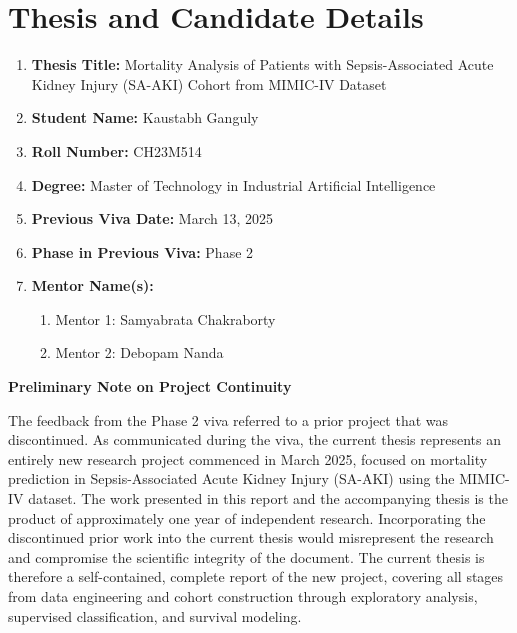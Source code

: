 \documentclass[12pt,a4paper]{article}
\begin{document}
\section*{}

\vspace{\baselineskip}

\section*{Thesis and Candidate Details}

\vspace{\baselineskip}

\begin{enumerate}
    \item \textbf{Thesis Title:} Mortality Analysis of Patients with Sepsis-Associated Acute Kidney Injury (SA-AKI) Cohort from MIMIC-IV Dataset
    \item \textbf{Student Name:} Kaustabh Ganguly
    \item \textbf{Roll Number:} CH23M514
    \item \textbf{Degree:} Master of Technology in Industrial Artificial Intelligence
    \item \textbf{Previous Viva Date:} March 13, 2025
    \item \textbf{Phase in Previous Viva:} Phase 2
    \item \textbf{Mentor Name(s):}
        \begin{enumerate}[label=(\roman*)]
            \item Mentor 1: Samyabrata Chakraborty
            \item Mentor 2: Debopam Nanda
        \end{enumerate}
\end{enumerate}

\vspace{\baselineskip}

\noindent\textbf{Preliminary Note on Project Continuity}

\vspace{0.5\baselineskip}

\noindent The feedback from the Phase 2 viva referred to a prior project that was discontinued. As communicated during the viva, the current thesis represents an entirely new research project commenced in March 2025, focused on mortality prediction in Sepsis-Associated Acute Kidney Injury (SA-AKI) using the MIMIC-IV dataset. The work presented in this report and the accompanying thesis is the product of approximately one year of independent research. Incorporating the discontinued prior work into the current thesis would misrepresent the research and compromise the scientific integrity of the document. The current thesis is therefore a self-contained, complete report of the new project, covering all stages from data engineering and cohort construction through exploratory analysis, supervised classification, and survival modeling.
\end{document}

